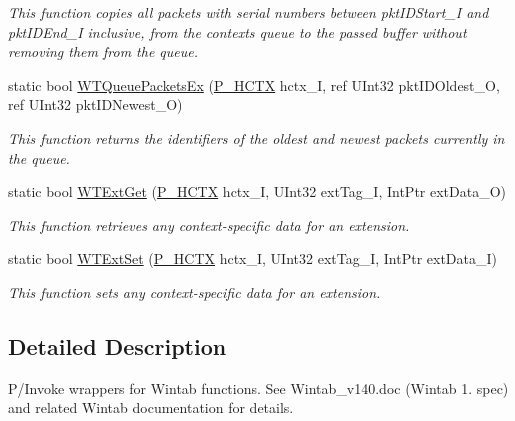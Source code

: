 \begin{DoxyCompactItemize}
\begin{DoxyCompactList}\small\item\em This function copies all packets with serial numbers between pkt\+I\+D\+Start\+\_\+I and pkt\+I\+D\+End\+\_\+I inclusive, from the context\textquotesingle{}s queue to the passed buffer without removing them from the queue. \end{DoxyCompactList}\item 
static bool \mbox{\hyperlink{class_wintab_d_n_1_1_c_wintab_funcs_af888c1a8e975d8e8badc08489b5db0e9}{W\+T\+Queue\+Packets\+Ex}} (\mbox{\hyperlink{namespace_wintab_d_n_a9ae61204cd14d7ef23008991d1fb6dff}{P\+\_\+\+H\+C\+TX}} hctx\+\_\+I, ref U\+Int32 pkt\+I\+D\+Oldest\+\_\+O, ref U\+Int32 pkt\+I\+D\+Newest\+\_\+O)
\begin{DoxyCompactList}\small\item\em This function returns the identifiers of the oldest and newest packets currently in the queue. \end{DoxyCompactList}\item 
static bool \mbox{\hyperlink{class_wintab_d_n_1_1_c_wintab_funcs_a49bdbe4e70471c2a45a985b71f1c9f64}{W\+T\+Ext\+Get}} (\mbox{\hyperlink{namespace_wintab_d_n_a9ae61204cd14d7ef23008991d1fb6dff}{P\+\_\+\+H\+C\+TX}} hctx\+\_\+I, U\+Int32 ext\+Tag\+\_\+I, Int\+Ptr ext\+Data\+\_\+O)
\begin{DoxyCompactList}\small\item\em This function retrieves any context-\/specific data for an extension. \end{DoxyCompactList}\item 
static bool \mbox{\hyperlink{class_wintab_d_n_1_1_c_wintab_funcs_aaf26a40c0581e56d526526f2d3b79cae}{W\+T\+Ext\+Set}} (\mbox{\hyperlink{namespace_wintab_d_n_a9ae61204cd14d7ef23008991d1fb6dff}{P\+\_\+\+H\+C\+TX}} hctx\+\_\+I, U\+Int32 ext\+Tag\+\_\+I, Int\+Ptr ext\+Data\+\_\+I)
\begin{DoxyCompactList}\small\item\em This function sets any context-\/specific data for an extension. \end{DoxyCompactList}\end{DoxyCompactItemize}


\subsection{Detailed Description}
P/\+Invoke wrappers for Wintab functions. See Wintab\+\_\+v140.\+doc (Wintab 1. spec) and related Wintab documentation for details. 




